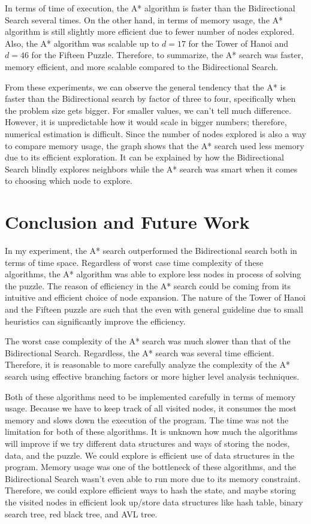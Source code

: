 \documentclass[conference]{IEEEtran}
\begin{document}
In terms of time of execution, the A* algorithm is faster than the Bidirectional Search several times. On the other hand, in terms of memory usage, the A* algorithm is still slightly more efficient due to fewer number of nodes explored. Also, the A* algorithm was scalable up to $d = 17$ for the Tower of Hanoi and $d = 46$ for the Fifteen Puzzle. Therefore, to summarize, the A* search was faster, memory efficient, and more scalable compared to the Bidirectional Search.

From these experiments, we can observe the general tendency that the A* is faster than the Bidirectional search by factor of three to four, specifically when the problem size gets bigger. For smaller values, we can't tell much difference. However, it is unpredictable how it would scale in bigger numbers; therefore, numerical estimation is difficult. Since the number of nodes explored is also a way to compare memory usage, the graph shows that the A* search used less memory due to its efficient exploration. It can be explained by how the Bidirectional Search blindly explores neighbors while the A* search was smart when it comes to choosing which node to explore.

\section{Conclusion and Future Work}
In my experiment, the A* search outperformed the Bidirectional search both in terms of time space. Regardless of worst case time complexity of these algorithms, the A* algorithm was able to explore less nodes in process of solving the puzzle. The reason of efficiency in the A* search could be coming from its intuitive and efficient choice of node expansion. The nature of the Tower of Hanoi and the Fifteen puzzle are such that the even with general guideline due to small heuristics can significantly improve the efficiency.

The worst case complexity of the A* search was much slower than that of the Bidirectional Search. Regardless, the A* search was several time efficient. Therefore, it is reasonable to more carefully analyze the complexity of the A* search using effective branching factors or more higher level analysis techniques.

Both of these algorithms need to be implemented carefully in terms of memory usage. Because we have to keep track of all visited nodes, it consumes the most memory and slows down the execution of the program. The time was not the limitation for both of these algorithms. It is unknown how much the algorithms will improve if we try different data structures and ways of storing the nodes, data, and the puzzle. We could explore is efficient use of data structures in the program. Memory usage was one of the bottleneck of these algorithms, and the Bidirectional Search wasn't even able to run more due to its memory constraint. Therefore, we could explore efficient ways to hash the state, and maybe storing the visited nodes in efficient look up/store data structures like hash table, binary search tree, red black tree, and AVL tree.
\end{document}
